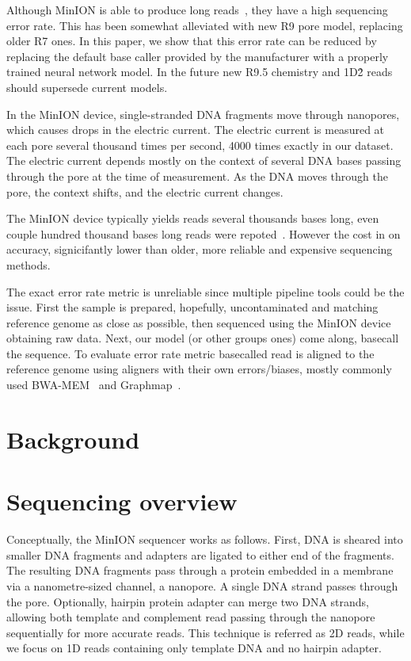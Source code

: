 \documentclass[runningheads,a4paper]{llncs}
\begin{document}
Although MinION is able to produce long reads~\cite{loman1-100k,loman2-800k}, they have a high sequencing error rate. This has been somewhat alleviated with new R9 pore model, replacing older R7 ones. In this paper, we show that this error rate can be reduced by replacing the default base caller provided by the manufacturer with a properly trained neural network model. In the future new R9.5 chemistry and 1D\^2 reads should supersede current models.

In the MinION device, single-stranded DNA fragments move through nanopores, which causes drops in the electric current. The electric current is measured at each pore several thousand times per second, 4000 times exactly in our dataset. The electric current depends mostly on the context of several DNA bases passing through the pore at the time of measurement. As the DNA moves through the pore, the context shifts, and the electric current changes.

The MinION device typically yields reads several thousands bases long, even couple hundred thousand bases long reads were repoted~\cite{loman1-100k,loman2-800k}. However the cost in on accuracy, signicifantly lower than older, more reliable and expensive sequencing methods.

The exact error rate metric is unreliable since multiple pipeline tools could be the issue. First the sample is prepared, hopefully, uncontaminated and matching reference genome as close as possible, then sequenced using the MinION device obtaining raw data. Next, our model (or other groups ones) come along, basecall the sequence. To evaluate error rate metric basecalled read is aligned to the reference genome using aligners with their own errors/biases, mostly commonly used BWA-MEM~\cite{li2013aligning} and Graphmap~\cite{sovic2016fast}.

\section{Background}

\section{Sequencing overview}
Conceptually, the MinION sequencer works as follows. First, DNA is sheared into smaller DNA fragments and adapters are ligated to either end of the fragments. The resulting DNA fragments pass through a protein embedded in a membrane via a nanometre-sized channel, a nanopore. A single DNA strand passes through the pore. Optionally, hairpin protein adapter can merge two DNA strands, allowing both template and complement read passing through the nanopore sequentially for more accurate reads. This technique is referred as 2D reads, while we focus on 1D reads containing only template DNA and no hairpin adapter.
\end{document}
